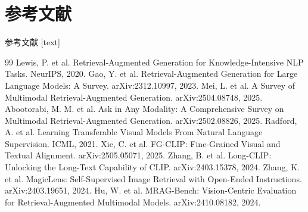 \documentclass[10pt,aspectratio=169,]{beamer}
\begin{document}
\section{参考文献}
\begin{frame}[allowframebreaks]{参考文献}
	\scriptsize
	[text]
	\begin{thebibliography}{99}
		Lewis, P. et al. Retrieval-Augmented Generation for Knowledge-Intensive NLP Tasks. NeurIPS, 2020.
		Gao, Y. et al. Retrieval-Augmented Generation for Large Language Models: A Survey. arXiv:2312.10997, 2023.
		Mei, L. et al. A Survey of Multimodal Retrieval-Augmented Generation. arXiv:2504.08748, 2025.
		Abootorabi, M. M. et al. Ask in Any Modality: A Comprehensive Survey on Multimodal Retrieval-Augmented Generation. arXiv:2502.08826, 2025.
		Radford, A. et al. Learning Transferable Visual Models From Natural Language Supervision. ICML, 2021.
		Xie, C. et al. FG-CLIP: Fine-Grained Visual and Textual Alignment. arXiv:2505.05071, 2025.
		Zhang, B. et al. Long-CLIP: Unlocking the Long-Text Capability of CLIP. arXiv:2403.15378, 2024.
		Zhang, K. et al. MagicLens: Self-Supervised Image Retrieval with Open-Ended Instructions. arXiv:2403.19651, 2024.
		Hu, W. et al. MRAG-Bench: Vision-Centric Evaluation for Retrieval-Augmented Multimodal Models. arXiv:2410.08182, 2024.
	\end{thebibliography}
\end{frame}
\end{document}
